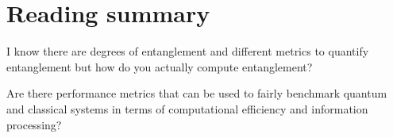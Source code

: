 \documentclass{alex_summary}
\begin{document}
\section*{Reading summary}



\begin{question1}
	I know there are degrees of entanglement and different metrics to quantify entanglement but how do you actually compute entanglement? 
\end{question1}


\begin{question3}
	Are there performance metrics that can be used to fairly benchmark quantum and classical systems in terms of computational efficiency and information processing?
\end{question3}

\printbibliography
\end{document}
